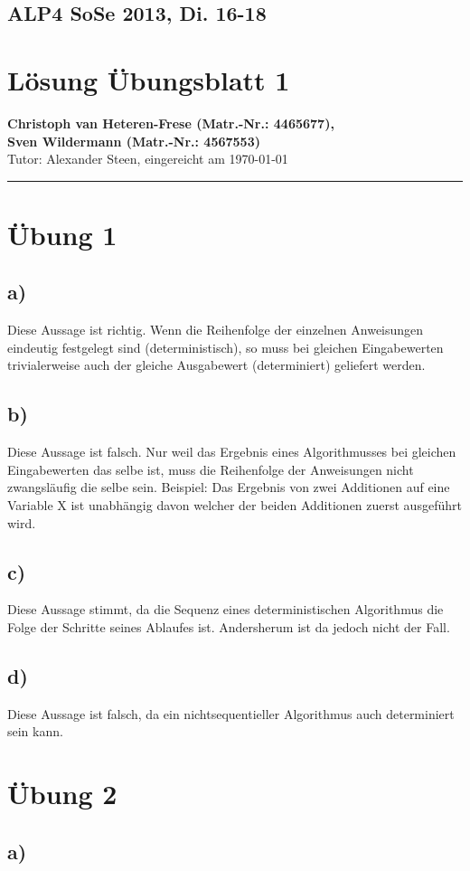 \documentclass[11pt,a4paper,DIV=10,]{scrartcl}
\begin{document}
\onecolumn
\subsection*{ALP4 SoSe 2013, Di. 16-18}
\section*{Lösung Übungsblatt 1}
\textbf{Christoph van Heteren-Frese (Matr.-Nr.: 4465677), \\ Sven Wildermann (Matr.-Nr.: 4567553)}\\
Tutor: Alexander Steen, eingereicht am \today\\
\hrule

\section*{Übung 1}
\subsection*{a)}
Diese Aussage ist richtig. Wenn die Reihenfolge der einzelnen Anweisungen eindeutig festgelegt sind (deterministisch), so muss bei gleichen
Eingabewerten trivialerweise auch der gleiche Ausgabewert (determiniert) geliefert  werden. 
\subsection*{b)}
Diese Aussage ist falsch. Nur weil das Ergebnis eines Algorithmusses bei gleichen Eingabewerten das selbe ist, muss die Reihenfolge der Anweisungen
nicht zwangsläufig die selbe sein. Beispiel: Das Ergebnis von zwei Additionen auf eine Variable X ist unabhängig davon welcher der beiden Additionen
zuerst ausgeführt wird. 
\subsection*{c)}
Diese Aussage stimmt, da die Sequenz eines deterministischen Algorithmus die Folge der Schritte seines Ablaufes ist. Andersherum ist da jedoch nicht der Fall. 
\subsection*{d)}
Diese Aussage ist falsch, da ein nichtsequentieller Algorithmus auch determiniert sein kann. 

\section*{Übung 2}
\subsection{a)}
\end{document}
